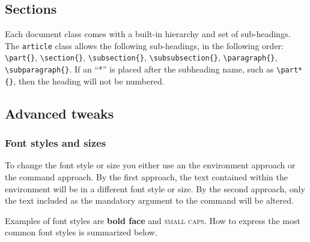\subsection{Sections}

Each document class comes with a built-in hierarchy and set of sub-headings. The \texttt{article} class allows the following sub-headings, in the following order: \verb|\part{}|, \verb|\section{}|, \verb|\subsection{}|, \verb|\subsubsection{}|, \verb|\paragraph{}|, \verb|\subparagraph{}|. If an ``*'' is placed after the subheading name, such as \verb|\part*{}|, then the heading will not be numbered. 

\subsection{Advanced tweaks}

\subsubsection*{Font styles and sizes} 

To change the font style or size you either use an the environment approach or the command approach. By the first approach, the text contained within the environment will be in a different font style or size. By the second approach, only the text included as the mandatory argument to the command will be altered.

Examples of font styles are \textbf{bold face} and \textsc{small caps}. How to express the most common font styles is summarized below.

